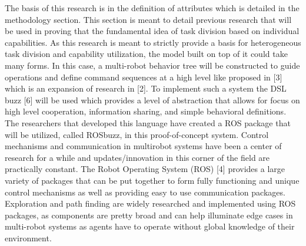 The basis of this research is in the definition of attributes which is detailed
in the methodology section. This section is meant to detail previous research
that will be used in proving that the fundamental idea of task division based
on individual capabilities. As this research is meant to strictly provide a basis
for heterogeneous task division and capability utilization, the model built on
top of it could take many forms. In this case, a multi-robot behavior tree will
be constructed to guide operations and define command sequences at a high level like
proposed in [3] which is an expansion of research in [2]. To implement such a
system the DSL buzz [6] will be used which provides a level of abstraction that
allows for focus on high level cooperation, information sharing, and simple
behavioral definitions. The researchers that developed this language have created a
ROS package that will be utilized, called ROSbuzz, in this proof-of-concept system.
Control mechanisms and communication in multirobot systems have been a center of
research for a while and updates/innovation in this corner of the field are practically
constant. The Robot Operating System (ROS) [4] provides a large variety of packages
that can be put together to form fully functioning and unique control mechanisms as
well as providing easy to use communication packages. Exploration and path finding
are widely researched and implemented using ROS packages, as components are pretty
broad and can help illuminate edge cases in multi-robot systems as agents have to
operate without global knowledge of their environment.
